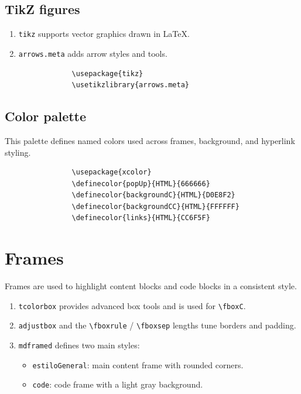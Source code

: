 \begin{minipage}{\anchoPag}
		\subsection{TikZ figures}
		
		\begin{enumerate}
			\item \texttt{tikz} supports vector graphics drawn in LaTeX.
			\item \texttt{arrows.meta} adds arrow styles and tools.
		\end{enumerate}
		
		\begin{mdframed}[style=code]
			\begin{verbatim}
				\usepackage{tikz}
				\usetikzlibrary{arrows.meta}
			\end{verbatim}
		\end{mdframed}
		
		\subsection{Color palette}
		
		This palette defines named colors used across frames, background, and hyperlink styling.
		
		\begin{mdframed}[style=code]
			\begin{verbatim}
				\usepackage{xcolor}
				\definecolor{popUp}{HTML}{666666}
				\definecolor{backgroundC}{HTML}{D0E8F2}
				\definecolor{backgroundCC}{HTML}{FFFFFF}
				\definecolor{links}{HTML}{CC6F5F}
			\end{verbatim}
		\end{mdframed}
		
		\section{Frames}\label{sec:frames}
		
		Frames are used to highlight content blocks and code blocks in a consistent style.
		
		\begin{enumerate}
			\item \texttt{tcolorbox} provides advanced box tools and is used for \texttt{\textbackslash fboxC}.
			\item \texttt{adjustbox} and the \texttt{\textbackslash fboxrule} / \texttt{\textbackslash fboxsep} lengths tune borders and padding.
			\item \texttt{mdframed} defines two main styles:
			\begin{itemize}
				\item \texttt{estiloGeneral}: main content frame with rounded corners.
				\item \texttt{code}: code frame with a light gray background.
			\end{itemize}
		\end{enumerate}
		

\end{minipage}
